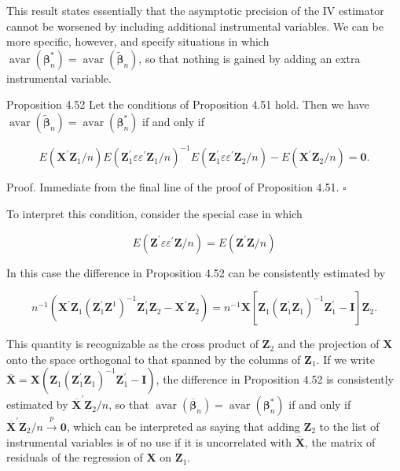 \documentclass[10pt]{article}
\begin{document}
This result states essentially that the asymptotic precision of the IV estimator cannot be worsened by including additional instrumental variables. We can be more specific, however, and specify situations in which $\operatorname{avar}\left(\boldsymbol{\beta}_{n}^{*}\right)=\operatorname{avar}\left(\tilde{\boldsymbol{\beta}}_{n}\right)$, so that nothing is gained by adding an extra instrumental variable.

Proposition 4.52 Let the conditions of Proposition 4.51 hold. Then we have $\operatorname{avar}\left(\tilde{\boldsymbol{\beta}}_{n}\right)=\operatorname{avar}\left(\boldsymbol{\beta}_{n}^{*}\right)$ if and only if

$$
E\left(\mathbf{X}^{\prime} \mathbf{Z}_{1} / n\right) E\left(\mathbf{Z}_{1}^{\prime} \varepsilon \varepsilon^{\prime} \mathbf{Z}_{1} / n\right)^{-1} E\left(\mathbf{Z}_{1}^{\prime} \varepsilon \varepsilon^{\prime} \mathbf{Z}_{2} / n\right)-E\left(\mathbf{X}^{\prime} \mathbf{Z}_{2} / n\right)=\mathbf{0} .
$$

Proof. Immediate from the final line of the proof of Proposition 4.51. \(\square\)

To interpret this condition, consider the special case in which

$$
E\left(\mathbf{Z}^{\prime} \varepsilon \varepsilon^{\prime} \mathbf{Z} / n\right)=E\left(\mathbf{Z}^{\prime} \mathbf{Z} / n\right)
$$

In this case the difference in Proposition 4.52 can be consistently estimated by

$$
n^{-1}\left(\mathbf{X}^{\prime} \mathbf{Z}_{1}\left(\mathbf{Z}_{1}^{\prime} \mathbf{Z}^{1}\right)^{-1} \mathbf{Z}_{1}^{\prime} \mathbf{Z}_{2}-\mathbf{X}^{\prime} \mathbf{Z}_{2}\right)=n^{-1} \mathbf{X}\left[\mathbf{Z}_{1}\left(\mathbf{Z}_{1}^{\prime} \mathbf{Z}_{1}\right)^{-1} \mathbf{Z}_{1}^{\prime}-\mathbf{I}\right] \mathbf{Z}_{2} .
$$

This quantity is recognizable as the cross product of $\mathbf{Z}_{2}$ and the projection of $\mathbf{X}$ onto the space orthogonal to that spanned by the columns of $\mathbf{Z}_{1}$. If we write $\overline{\mathbf{X}}=\mathbf{X}\left(\mathbf{Z}_{1}\left(\mathbf{Z}_{1}^{\prime} \mathbf{Z}_{1}\right)^{-1} \mathbf{Z}_{1}^{\prime}-\mathbf{I}\right)$, the difference in Proposition 4.52 is consistently estimated by $\overline{\mathbf{X}}^{\prime} \mathbf{Z}_{2} / n$, so that $\operatorname{avar}\left(\overline{\boldsymbol{\beta}}_{n}\right)=\operatorname{avar}\left(\boldsymbol{\beta}_{n}^{*}\right)$ if and only if $\overline{\mathbf{X}}^{\prime} \mathbf{Z}_{2} / n \xrightarrow{p} \mathbf{0}$, which can be interpreted as saying that adding $\mathbf{Z}_{2}$ to the list of instrumental variables is of no use if it is uncorrelated with $\overline{\mathbf{X}}$, the matrix of residuals of the regression of $\mathbf{X}$ on $\mathbf{Z}_{1}$.
\end{document}
